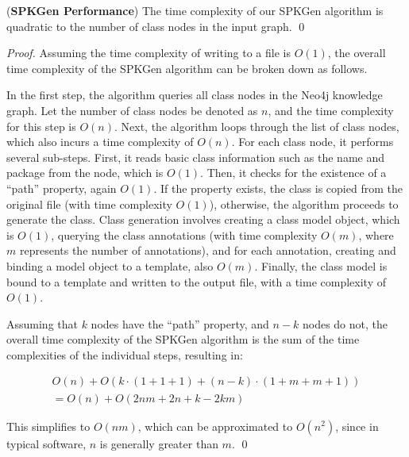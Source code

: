 \documentclass[runningheads]{llncs}
\begin{document}
\begin{theorem}(\textbf{SPKGen Performance})
The time complexity of our SPKGen algorithm is quadratic to the number of class nodes in the input graph.
\qed
\end{theorem}

\begin{proof}

Assuming the time complexity of writing to a file is $O(1)$, the overall time complexity of the SPKGen algorithm can be broken down as follows.

In the first step, the algorithm queries all class nodes in the Neo4j knowledge graph. Let the number of class nodes be denoted as $n$, and the time complexity for this step is $O(n)$. Next, the algorithm loops through the list of class nodes, which also incurs a time complexity of $O(n)$. For each class node, it performs several sub-steps. First, it reads basic class information such as the name and package from the node, which is $O(1)$. Then, it checks for the existence of a “path” property, again $O(1)$. If the property exists, the class is copied from the original file (with time complexity $O(1)$), otherwise, the algorithm proceeds to generate the class. Class generation involves creating a class model object, which is $O(1)$, querying the class annotations (with time complexity $O(m)$, where $m$ represents the number of annotations), and for each annotation, creating and binding a model object to a template, also $O(m)$. Finally, the class model is bound to a template and written to the output file, with a time complexity of $O(1)$.

Assuming that $k$ nodes have the “path” property, and $n - k$ nodes do not, the overall time complexity of the SPKGen algorithm is the sum of the time complexities of the individual steps, resulting in:

\vspace{-0.5cm}
\begin{equation}
\begin{split}
O(n) + O \left( k \cdot (1 + 1 + 1) + (n - k) \cdot (1 + m + m + 1) \right) \\
= O(n) + O(2nm + 2n + k - 2km) \nonumber
\end{split}
\end{equation}


This simplifies to $O(nm)$, which can be approximated to $O(n^2)$, since in typical software, $n$ is generally greater than $m$. 
\qed
\end{proof}
\end{document}
